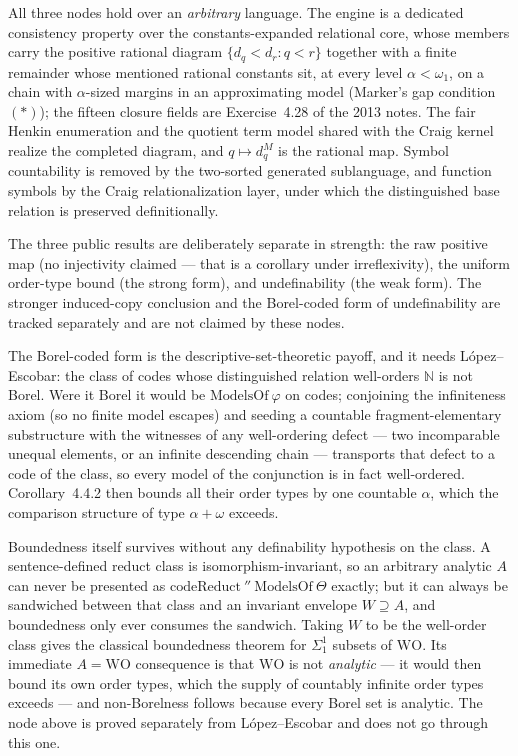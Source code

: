 All three nodes hold over an \emph{arbitrary} language.  The engine is a dedicated
consistency property over the constants-expanded relational core, whose members carry the
positive rational diagram $\{d_q < d_r : q < r\}$ together with a finite remainder whose
mentioned rational constants sit, at every level $\alpha < \omega_1$, on a chain with
$\alpha$-sized margins in an approximating model (Marker's gap condition~$(*)$); the
fifteen closure fields are Exercise~4.28 of the 2013 notes.  The fair Henkin enumeration and the quotient
term model shared with the Craig kernel realize the completed diagram, and $q \mapsto
d_q^M$ is the rational map.  Symbol countability is removed by the two-sorted generated
sublanguage, and function symbols by the Craig relationalization layer, under which the
distinguished base relation is preserved definitionally.

The three public results are deliberately separate in strength: the raw positive map (no
injectivity claimed — that is a corollary under irreflexivity), the uniform order-type
bound (the strong form), and undefinability (the weak form).  The stronger induced-copy
conclusion and the Borel-coded form of undefinability are tracked separately and are not
claimed by these nodes.




The Borel-coded form is the descriptive-set-theoretic payoff, and it needs
L\'opez--Escobar: the class of codes whose distinguished relation well-orders
$\mathbb{N}$ is not Borel.  Were it Borel it would be $\mathrm{ModelsOf}\
\varphi$ on codes; conjoining the infiniteness axiom (so no finite model
escapes) and seeding a countable fragment-elementary substructure with the
witnesses of any well-ordering defect --- two incomparable unequal elements, or
an infinite descending chain --- transports that defect to a code of the class,
so every model of the conjunction is in fact well-ordered.  Corollary~4.4.2 then
bounds all their order types by one countable $\alpha$, which the comparison
structure of type $\alpha + \omega$ exceeds.


Boundedness itself survives without any definability hypothesis on the class.  A
sentence-defined reduct class is isomorphism-invariant, so an arbitrary analytic
$A$ can never be presented as $\mathrm{codeReduct}\ ''\ \mathrm{ModelsOf}\ \Theta$
exactly; but it can always be sandwiched between that class and an invariant
envelope $W \supseteq A$, and boundedness only ever consumes the sandwich.  Taking
$W$ to be the well-order class gives the classical boundedness theorem for
$\Sigma^1_1$ subsets of $\mathrm{WO}$.  Its immediate $A = \mathrm{WO}$ consequence
is that $\mathrm{WO}$ is not \emph{analytic} --- it would then bound its own order
types, which the supply of countably infinite order types exceeds --- and
non-Borelness follows because every Borel set is analytic.  The node above is
proved separately from L\'opez--Escobar and does not go through this one.

